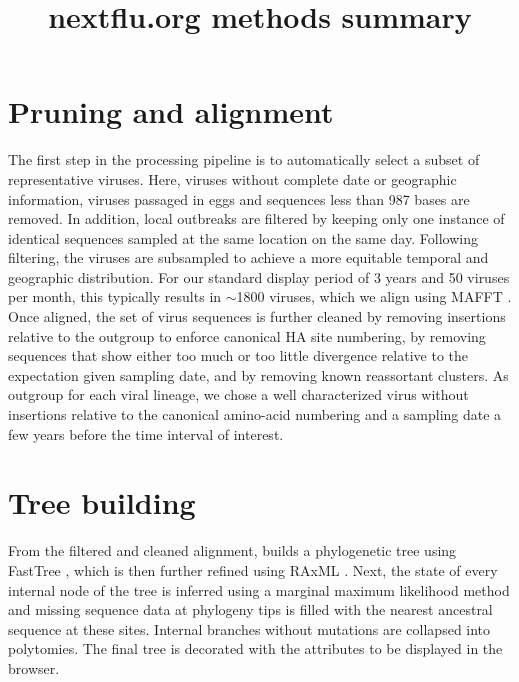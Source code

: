 \title{nextflu.org methods summary}

\section{Pruning and alignment}
The first step in the processing pipeline is to automatically select a subset of representative viruses.
Here, viruses without complete date or geographic information, viruses passaged in eggs and sequences less than 987 bases are removed.
In addition, local outbreaks are filtered by keeping only one instance of identical sequences sampled at the same location on the same day.
Following filtering, the viruses are subsampled to achieve a more equitable temporal and geographic distribution.
For our standard display period of 3 years and 50 viruses per month, this typically results in $\sim$1800 viruses, which we align using MAFFT \citep{katoh_mafft_2013}.
Once aligned, the set of virus sequences is further cleaned by removing insertions relative to the outgroup to enforce canonical HA site numbering, by removing sequences that show either too much or too little divergence relative to the expectation given sampling date, and by removing known reassortant clusters. As outgroup for each viral lineage, we chose a well characterized virus without insertions relative to the canonical amino-acid numbering and a sampling date a few years before the time interval of interest.

\section{Tree building}
From the filtered and cleaned alignment, \augur{} builds a phylogenetic tree using FastTree \citep{price_fasttree_2009}, which is then further refined using RAxML \citep{stamatakis_raxml_2014}.
Next, the state of every internal node of the tree is inferred using a marginal maximum likelihood method and missing sequence data at phylogeny tips is filled with the nearest ancestral sequence at these sites.
Internal branches without mutations are collapsed into polytomies.
The final tree is decorated with the attributes to be displayed in the browser. 

